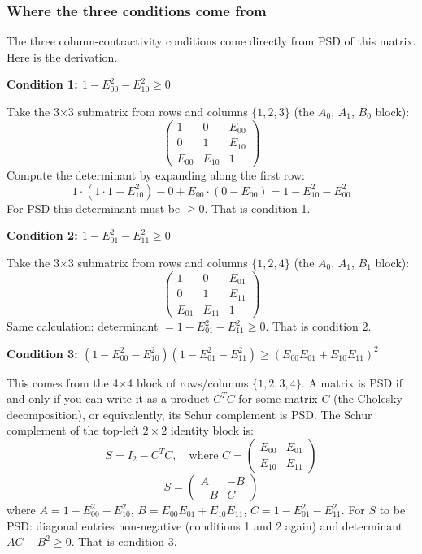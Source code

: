 \documentclass[11pt,a4paper]{article}
\theoremstyle{plain}
\theoremstyle{definition}
\theoremstyle{remark}
\begin{document}
\subsubsection{Where the three conditions come from}

The three column-contractivity conditions come directly from PSD of this matrix. Here is the derivation.

\medskip
\noindent\textbf{Condition 1: $1 - E_{00}^2 - E_{10}^2 \geq 0$}

Take the 3×3 submatrix from rows and columns $\{1, 2, 3\}$ (the $A_0$, $A_1$, $B_0$ block):
\[
\begin{pmatrix} 1 & 0 & E_{00} \\ 0 & 1 & E_{10} \\ E_{00} & E_{10} & 1 \end{pmatrix}
\]
Compute the determinant by expanding along the first row:
\[
1 \cdot (1 \cdot 1 - E_{10}^2) - 0 + E_{00} \cdot (0 - E_{00}) = 1 - E_{10}^2 - E_{00}^2
\]
For PSD this determinant must be $\geq 0$. That is condition 1.

\medskip
\noindent\textbf{Condition 2: $1 - E_{01}^2 - E_{11}^2 \geq 0$}

Take the 3×3 submatrix from rows and columns $\{1, 2, 4\}$ (the $A_0$, $A_1$, $B_1$ block):
\[
\begin{pmatrix} 1 & 0 & E_{01} \\ 0 & 1 & E_{11} \\ E_{01} & E_{11} & 1 \end{pmatrix}
\]
Same calculation: determinant $= 1 - E_{01}^2 - E_{11}^2 \geq 0$. That is condition 2.

\medskip
\noindent\textbf{Condition 3: $(1 - E_{00}^2 - E_{10}^2)(1 - E_{01}^2 - E_{11}^2) \geq (E_{00}E_{01} + E_{10}E_{11})^2$}

This comes from the 4×4 block of rows/columns $\{1,2,3,4\}$. A matrix is PSD if and only if you can write it as a product $C^T C$ for some matrix $C$ (the Cholesky decomposition), or equivalently, its Schur complement is PSD. The Schur complement of the top-left $2 \times 2$ identity block is:
\[
S = I_2 - C^T C, \quad \text{where } C = \begin{pmatrix} E_{00} & E_{01} \\ E_{10} & E_{11} \end{pmatrix}
\]
\[
S = \begin{pmatrix} A & -B \\ -B & C \end{pmatrix}
\]
where $A = 1 - E_{00}^2 - E_{10}^2$, $B = E_{00}E_{01} + E_{10}E_{11}$, $C = 1 - E_{01}^2 - E_{11}^2$.
For $S$ to be PSD: diagonal entries non-negative (conditions 1 and 2 again) and determinant $AC - B^2 \geq 0$. That is condition 3.
\end{document}
